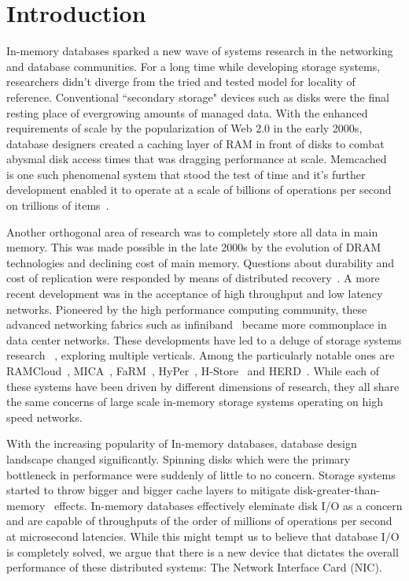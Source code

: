 
\chapter{Introduction}
In-memory databases sparked a new wave of systems research in the 
networking and database communities. For a long time while developing storage
systems, researchers didn't diverge from the  tried and tested model for
locality of reference. Conventional ``secondary storage" devices
such as disks were the final resting place of evergrowing amounts of managed data. With the 
enhanced requirements of scale by the popularization of Web 2.0 in the early 2000s, 
database designers created a caching layer of RAM in front of disks
to combat abysmal disk access times that was dragging performance at scale. Memcached~\cite{memcached-orig}
is one such phenomenal system that stood the test of time and it's further development
enabled it to operate at a scale of billions of operations per second on trillions of items~\cite{nishtala2013scaling}.

Another orthogonal area of research was to completely store all data in main memory.
This was made possible in the late 2000s by the evolution of DRAM technologies and declining cost of main memory.
Questions about durability and cost of replication 
were responded by means of distributed recovery~\cite{ongaro2011fast}. 
A more recent development was in the acceptance of high throughput and low latency networks. 
Pioneered by the high performance computing community, these advanced networking fabrics 
such as infiniband~\cite{pfister2001introduction} became more commonplace in 
data center networks. These developments have led to a deluge of storage systems research~\cite{mmdbmstutorial} ,
exploring multiple verticals. Among the particularly notable ones are RAMCloud~\cite{ramcloud},
MICA~\cite{mica}, FaRM~\cite{farm}, HyPer~\cite{hyper}, H-Store~\cite{hstore} 
and HERD~\cite{herd}. While each of these systems have been driven by different dimensions 
of research, they all share the same concerns of large scale in-memory storage systems 
operating on high speed networks.


With the increasing popularity of In-memory databases, database design landscape changed significantly.
Spinning disks which were the primary bottleneck in performance were suddenly 
of little to no concern. Storage systems started to throw bigger and bigger cache layers to mitigate 
disk-greater-than-memory~\cite{couchbase} effects. In-memory databases effectively eleminate disk I/O
as a concern and are capable of throughputs of the order of millions of operations per second
at microsecond latencies. While this might tempt us to believe that database I/O is completely
solved, we argue that there is a new device that dictates the overall performance of these 
distributed systems: The Network Interface Card (NIC).


